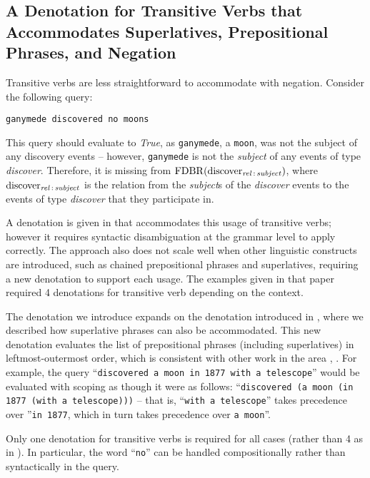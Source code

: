 \documentclass[../main.tex]{subfiles}
\begin{document}
\begin{refsection}
\subsection{A Denotation for Transitive Verbs that Accommodates Superlatives, Prepositional Phrases, and Negation}
\label{webist2020conf:tvs}

Transitive verbs are less straightforward to accommodate with negation.  Consider the following query:
\begin{center}
    \texttt{ganymede discovered no moons}
\end{center}
\noindent This query should evaluate to \textit{True}, as \texttt{ganymede}, a \texttt{moon}, was not the subject of any discovery events -- however, \texttt{ganymede} is not the \textit{subject} of any events of type \textit{discover}.  Therefore, it is missing from $\operatorname{FDBR}({\operatorname{discover}_{\operatorname{\mathit{rel}}\,:\,\operatorname{\mathit{subject}}}})$, where $\operatorname{discover}_{\operatorname{\mathit{rel}}\,:\,\operatorname{\mathit{subject}}}$ is the relation from the \textit{subject}s of the \textit{discover} events to the events of type \textit{discover} that they participate in.

A denotation is given in \cite{frostboulos2002} that accommodates this usage of transitive verbs; however it requires syntactic disambiguation at the grammar level to apply correctly.  The approach also does not scale well when other linguistic constructs are introduced, such as chained prepositional phrases and superlatives, requiring a new denotation to support each usage.  The examples given in that paper required 4 denotations for transitive verb depending on the context.

The denotation we introduce expands on the denotation introduced in \cite{frostpeelar2019}, where we described how superlative phrases can also be accommodated.  This new denotation evaluates the list of prepositional phrases (including superlatives) in leftmost-outermost order, which is consistent with other work in the area \cite{champollion2010quantification}, \cite{ferre2014squall}.  For example, the query ``\texttt{discovered a moon in 1877 with a telescope}'' would be evaluated with scoping as though it were as follows:
``\texttt{discovered (a moon (in 1877 (with a telescope)))} -- that is, ``\texttt{with a telescope}'' takes precedence over ''\texttt{in 1877}, which in turn takes precedence over \texttt{a moon}''.

Only one denotation for transitive verbs is required for all cases (rather than 4 as in \cite{frostboulos2002}). In particular, the word ``\texttt{no}'' can be handled compositionally rather than syntactically in the query.


\end{refsection}
\end{document}
